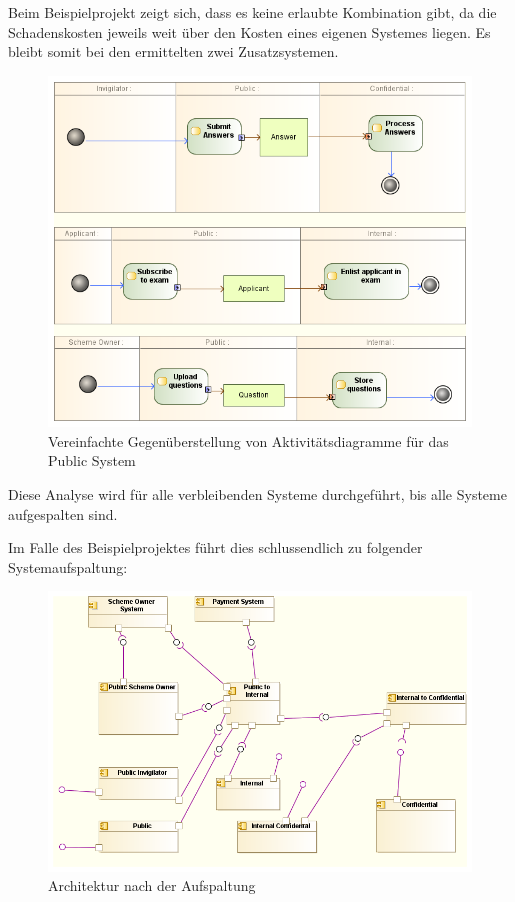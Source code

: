 Beim Beispielprojekt zeigt sich, dass es keine erlaubte Kombination gibt, da die Schadenskosten jeweils weit über den Kosten eines eigenen Systemes liegen. Es bleibt somit bei den ermittelten zwei Zusatzsystemen.

\begin{figure}[H]
    \centering
    \includegraphics[scale=0.6]{uml/actorarch.png}
    \caption{Vereinfachte Gegenüberstellung von Aktivitätsdiagramme für das Public System}
    \label{fig:actorarch}
\end{figure}

Diese Analyse wird für alle verbleibenden Systeme durchgeführt, bis alle Systeme aufgespalten sind.

Im Falle des Beispielprojektes führt dies schlussendlich zu folgender Systemaufspaltung:

\begin{figure}[H]
    \centering
    \includegraphics[scale=0.6]{uml/vision4.png}
    \caption{Architektur nach der Aufspaltung }
\end{figure}

